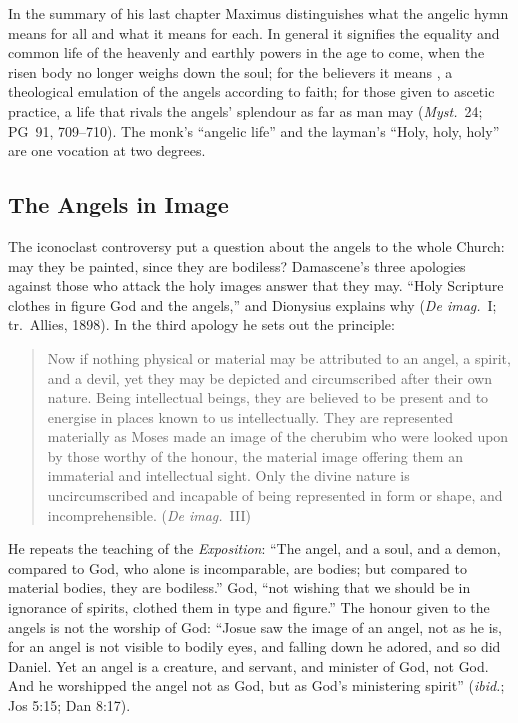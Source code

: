 In the summary of his last chapter Maximus distinguishes what the angelic
hymn means for all and what it means for each. In general it signifies the
equality and common life of the heavenly and earthly powers in the age to
come, when the risen body no longer weighs down the soul; for the believers
it means ,
a theological emulation of the angels according to faith; for those given
to ascetic practice, a life that rivals the angels' splendour as far as man
may (\emph{Myst.}\ 24; PG~91, 709--710). The monk's ``angelic life'' and the
layman's ``Holy, holy, holy'' are one vocation at two degrees.

\sectionguard
\subsection{The Angels in Image}\label{sec:bz-images}

The iconoclast controversy put a question about the angels to the whole
Church: may they be painted, since they are bodiless? Damascene's three
apologies against those who attack the holy images answer that they may.
``Holy Scripture clothes in figure God and the angels,'' and Dionysius
explains why (\emph{De imag.}\ I; tr.\ Allies, 1898). In the third apology
he sets out the principle:

\begin{quote}
Now if nothing physical or material may be attributed to an angel, a
spirit, and a devil, yet they may be depicted and circumscribed after their
own nature. Being intellectual beings, they are believed to be present and
to energise in places known to us intellectually. They are represented
materially as Moses made an image of the cherubim who were looked upon by
those worthy of the honour, the material image offering them an immaterial
and intellectual sight. Only the divine nature is uncircumscribed and
incapable of being represented in form or shape, and incomprehensible.
(\emph{De imag.}\ III)
\end{quote}

\noindent He repeats the teaching of the \emph{Exposition}: ``The angel,
and a soul, and a demon, compared to God, who alone is incomparable, are
bodies; but compared to material bodies, they are bodiless.'' God, ``not
wishing that we should be in ignorance of spirits, clothed them in type and
figure.'' The honour given to the angels is not the worship of God: ``Josue
saw the image of an angel, not as he is, for an angel is not visible to
bodily eyes, and falling down he adored, and so did Daniel. Yet an angel is
a creature, and servant, and minister of God, not God. And he worshipped the
angel not as God, but as God's ministering spirit'' (\emph{ibid.}; Jos
5:15; Dan 8:17).

